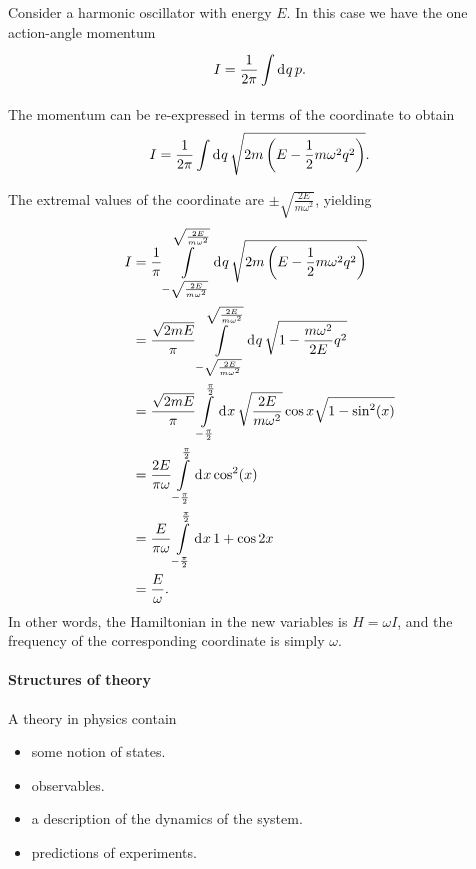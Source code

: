 Consider a harmonic oscillator with energy $E$. In this case we have the one action-angle momentum
\begin{align*}
	I = \frac{1}{2\pi}\int\limits_{}^{}\dd[]{q}p.
\end{align*}
The momentum can be re-expressed in terms of the coordinate to obtain
\begin{align*}
	I = \frac{1}{2\pi}\int\limits_{}^{}\dd[]{q}\sqrt{2m\left(E - \frac{1}{2}m\omega^{2}q^{2}\right)}.
\end{align*}
The extremal values of the coordinate are $\pm\sqrt{\frac{2E}{m\omega^{2}}}$, yielding
\begin{align*}
	I &= \frac{1}{\pi}\int\limits_{-\sqrt{\frac{2E}{m\omega^{2}}}}^{\sqrt{\frac{2E}{m\omega^{2}}}}\dd[]{q}\sqrt{2m\left(E - \frac{1}{2}m\omega^{2}q^{2}\right)} \\
	  &= \frac{\sqrt{2mE}}{\pi}\int\limits_{-\sqrt{\frac{2E}{m\omega^{2}}}}^{\sqrt{\frac{2E}{m\omega^{2}}}}\dd[]{q}\sqrt{1 - \frac{m\omega^{2}}{2E}q^{2}} \\
	  &= \frac{\sqrt{2mE}}{\pi}\int\limits_{-\frac{\pi}{2}}^{\frac{\pi}{2}}\dd[]{x}\sqrt{\frac{2E}{m\omega^{2}}}\cos{x}\sqrt{1 - \sin[2](x)} \\
	  &= \frac{2E}{\pi\omega}\int\limits_{-\frac{\pi}{2}}^{\frac{\pi}{2}}\dd[]{x}\cos[2](x) \\
	  &= \frac{E}{\pi\omega}\int\limits_{-\frac{\pi}{2}}^{\frac{\pi}{2}}\dd[]{x}1 + \cos{2x} \\
	  &= \frac{E}{\omega}.
\end{align*}
In other words, the Hamiltonian in the new variables is $H = \omega I$, and the frequency of the corresponding coordinate is simply $\omega$.

\paragraph{Structures of theory}
A theory in physics contain
\begin{itemize}
	\item some notion of states.
	\item observables.
	\item a description of the dynamics of the system.
	\item predictions of experiments.
\end{itemize}

